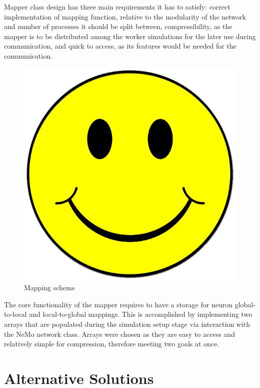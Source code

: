 Mapper class design has three main requirements it has to satisfy: correct implementation of mapping function, relative to the modularity of the network and number of processes it should be split between, compressibility, as the mapper is to be distributed among the worker simulations for the later use during communication, and quick to access, as its features would be needed for the communication.

\begin{figure}[h]
\begin{center}
\includegraphics[scale = 0.1]{images/placeholder.jpg}
\end{center}
\caption{Mapping scheme}
\end{figure}

The core functionality of the mapper requires to have a storage for neuron global-to-local and local-to-global mappings. This is accomplished by implementing two arrays that are populated during the simulation setup stage via interaction with the NeMo network class. Arrays were chosen as they are easy to access and relatively simple for compression, therefore meeting two goals at once.

\section{Alternative Solutions}

